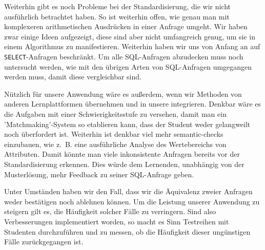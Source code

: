 Weiterhin gibt es noch Probleme bei der Standardisierung, die wir nicht ausführlich betrachtet haben. So ist weiterhin offen, wie genau man mit komplexeren arithmetischen Ausdrücken in einer Anfrage umgeht. Wir haben zwar einige Ideen aufgezeigt, diese sind aber nicht umfangreich genug, um sie in einem Algorithmus zu manifestieren. Weiterhin haben wir uns von Anfang an auf \verb|SELECT|-Anfragen beschränkt. Um alle SQL-Anfragen abzudecken muss noch untersucht werden, wie mit den übrigen Arten von SQL-Anfragen umgegangen werden muss, damit diese vergleichbar sind. 

Nützlich für unsere Anwendung wäre es außerdem, wenn wir Methoden von anderen Lernplattformen übernehmen und in unsere integrieren. Denkbar wäre es die Aufgaben mit einer Schwierigkeitsstufe zu versehen, damit man ein 'Matchmaking'-System so etablieren kann, dass der Student weder gelangweilt noch überfordert ist. Weiterhin ist denkbar viel mehr semantic-checks einzubauen, wie \mbox{z. B.} eine ausführliche Analyse des Wertebereichs von Attributen. Damit könnte man viele inkonsistente Anfragen bereits vor der Standardisierung erkennen. Dies würde dem Lernenden, unabhängig von der Musterlösung, mehr Feedback zu seiner SQL-Anfrage geben. 

Unter Umständen haben wir den Fall, dass wir die Äquivalenz zweier Anfragen weder bestätigen noch ablehnen können. Um die Leistung unserer Anwendung zu steigern gilt es, die Häufigkeit solcher Fälle zu verringern. Sind also Verbesserungen implementiert worden, so macht es Sinn Testreihen mit Studenten durchzuführen und zu messen, ob die Häufigkeit dieser ungünstigen Fälle zurückgegangen ist.

